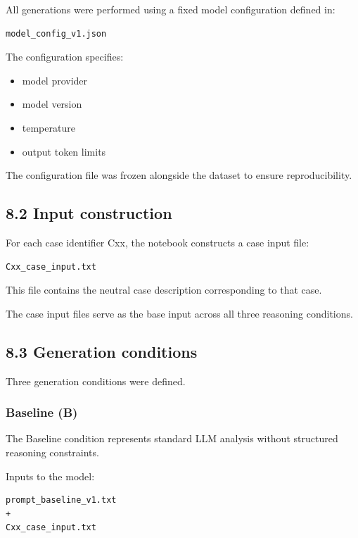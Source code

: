 {All generations were performed using a fixed model configuration defined in:

\begin{verbatim}
model_config_v1.json
\end{verbatim}

The configuration specifies:

\begin{itemize}
\item model provider
\item model version
\item temperature
\item output token limits
\end{itemize}

The configuration file was frozen alongside the dataset to ensure reproducibility.

\subsection*{8.2 Input construction}

For each case identifier Cxx, the notebook constructs a case input file:

\begin{verbatim}
Cxx_case_input.txt
\end{verbatim}

This file contains the neutral case description corresponding to that case.

The case input files serve as the base input across all three reasoning conditions.

\subsection*{8.3 Generation conditions}

Three generation conditions were defined.

\subsubsection*{Baseline (B)}

The Baseline condition represents standard LLM analysis without structured reasoning constraints.

Inputs to the model:

\begin{verbatim}
prompt_baseline_v1.txt
+
Cxx_case_input.txt
\end{verbatim}

}
